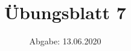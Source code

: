 

\subject{Computational Physics}
\title{Übungsblatt 7}
\date{%
  Abgabe: 13.06.2020
}



\maketitle
\thispagestyle{empty}
\newpage




%



